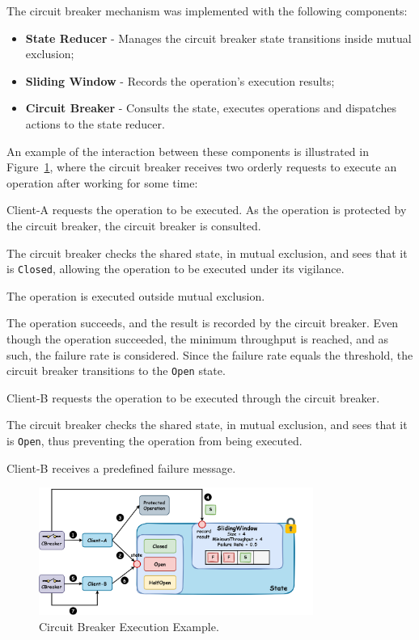 The circuit breaker mechanism was implemented with the following components:

\begin{itemize}
    \item \textbf{State Reducer} - Manages the circuit breaker state transitions inside mutual exclusion;
    \item \textbf{Sliding Window} - Records the operation's execution results;
    \item \textbf{Circuit Breaker} - Consults the state, executes operations and dispatches actions to the state reducer.
\end{itemize}

An example of the interaction between these components is illustrated in Figure~\ref{fig:circuit-breaker-execution-example},
where the circuit breaker receives two orderly requests to execute an operation after working for some time:

\begin{boldenumerate}
    \item Client-A requests the operation to be executed.
    As the operation is protected by the circuit breaker, the circuit breaker is consulted.
    \item The circuit breaker checks the shared state, in mutual exclusion,
    and sees that it is \texttt{Closed}, allowing the operation to be executed under its vigilance.
    \item The operation is executed outside mutual exclusion.
    \item The operation succeeds, and the result is recorded by the circuit breaker.
    Even though the operation succeeded, the minimum throughput is reached,
    and as such, the failure rate is considered.
    Since the failure rate equals the threshold, the circuit breaker transitions to the \texttt{Open} state.
    \item Client-B requests the operation to be executed through the circuit breaker.
    \item The circuit breaker checks the shared state, in mutual exclusion, and sees that it is \texttt{Open}, thus preventing the operation from being executed.
    \item Client-B receives a predefined failure message.
\end{boldenumerate}

\begin{figure}[!htb]
    \centering
    \includegraphics[width=0.8\textwidth]{../figures/05_cbreaker-execution-example}
    \caption{Circuit Breaker Execution Example.}
    \label{fig:circuit-breaker-execution-example}
\end{figure}

